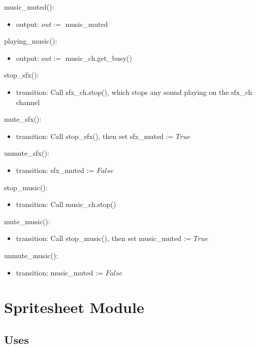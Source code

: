 \documentclass[12pt]{article}
\begin{document}
\noindent music\_muted():
\begin{itemize}
\item output: $out := $ music\_muted
\end{itemize}

\noindent playing\_music():
\begin{itemize}
\item output: $out := $ music\_ch.get\_busy()
\end{itemize}

\noindent stop\_sfx():
\begin{itemize}
\item transition: Call sfx\_ch.stop(), which stops any sound playing on the sfx\_ch channel
\end{itemize}

\noindent mute\_sfx():
\begin{itemize}
\item transition: Call stop\_sfx(), then set sfx\_muted := $True$
\end{itemize}

\noindent unmute\_sfx():
\begin{itemize}
\item transition: sfx\_muted := $False$
\end{itemize}

\noindent stop\_music():
\begin{itemize}
\item transition: Call music\_ch.stop()
\end{itemize}

\noindent mute\_music():
\begin{itemize}
\item transition: Call stop\_music(), then set music\_muted := $True$
\end{itemize}

\noindent unmute\_music():
\begin{itemize}
\item transition: music\_muted := $False$
\end{itemize}

\newpage

\section* {Spritesheet Module}

\subsection* {Uses}
\end{document}
